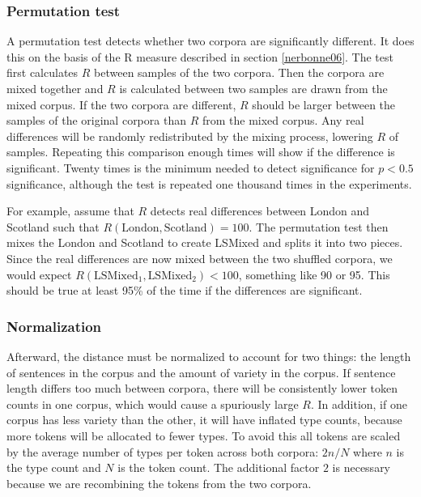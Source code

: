 \documentclass[11pt]{article}
\begin{document}
\subsubsection{Permutation test}
\label{permutationtest}

A permutation test detects whether two corpora are significantly
different. It does this on the basis of the R measure described in
section \ref{nerbonne06}. The test first calculates $R$ between
samples of the two corpora. Then the corpora are mixed together and
$R$ is calculated between two samples are drawn from the mixed
corpus. If the two corpora are different, $R$ should be larger between
the samples of the original corpora than $R$ from the mixed
corpus. Any real differences will be randomly redistributed by the
mixing process, lowering $R$ of samples. Repeating this comparison
enough times will show if the difference is significant. Twenty times
is the minimum needed to detect significance for $p < 0.5$
significance, although the test is repeated one thousand times in the
experiments.

For example, assume that $R$ detects real differences between London
and Scotland such that $R(\textrm{London},\textrm{Scotland}) =
100$. The permutation test then mixes the London and Scotland to
create LSMixed and splits it into two pieces. Since the real
differences are now mixed between the two shuffled corpora, we
would expect $R(\textrm{LSMixed}_1, \textrm{LSMixed}_2) < 100$, something
like 90 or 95. This should be true at least 95\% of the time if the
differences are significant.

\subsubsection{Normalization}
Afterward, the distance must be normalized to account for two things:
the length of sentences in the corpus and the amount of variety in the
corpus. If sentence length differs too much between corpora, there
will be consistently lower token counts in one corpus, which would
cause a spuriously large $R$. In addition, if one corpus has less
variety than the other, it will have inflated type counts, because
more tokens will be allocated to fewer types. To avoid
this all tokens are scaled by the average number of types per token
across both corpora: $2n/N$ where $n$ is the type count and $N$ is
the token count. The additional factor $2$ is necessary because we are
recombining the tokens from the two corpora.

\end{document}

